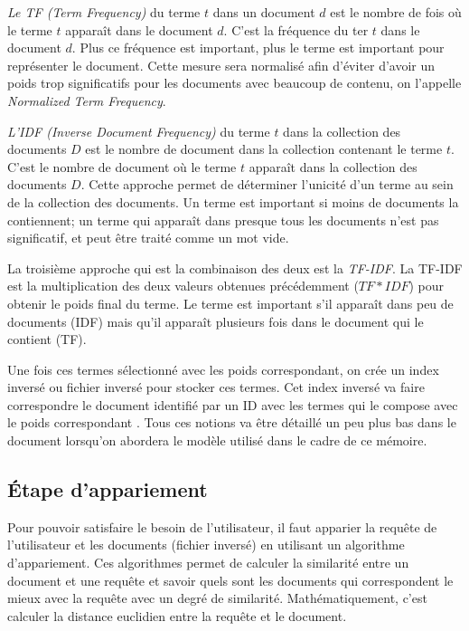 \textit{Le TF (Term Frequency)} du terme $t$ dans un document $d$ est le nombre de fois où le terme $t$ apparaît dans le document $d$. C'est la fréquence du ter $t$ dans le document $d$. Plus ce fréquence est important, plus le terme est important pour représenter le document. Cette mesure sera normalisé afin d'éviter d'avoir un poids trop significatifs pour les documents avec beaucoup de contenu, on l'appelle \textit{Normalized Term Frequency}.

\textit{L'IDF (Inverse Document Frequency)} du terme $t$ dans la collection des documents $D$ est le nombre de document dans la collection contenant le terme $t$. C'est le nombre de document où le terme $t$ apparaît dans la collection des documents $D$. Cette approche permet de déterminer l'unicité d'un terme au sein de la collection des documents. Un terme est important si moins de documents la contiennent; un terme qui apparaît dans presque tous les documents n'est pas significatif, et peut être traité comme un mot vide.

La troisième approche qui est la combinaison des deux est la \textit{TF-IDF}. La TF-IDF est la multiplication des deux valeurs obtenues précédemment ($TF*IDF$) pour obtenir le poids final du terme. Le terme est important s'il apparaît dans peu de documents (IDF) mais qu'il apparaît plusieurs fois dans le document qui le contient (TF).

Une fois ces termes sélectionné avec les poids correspondant, on crée un index inversé ou fichier inversé pour stocker ces termes. Cet index inversé va faire correspondre le document identifié par un ID avec les termes qui le compose avec le poids correspondant \citep*{vsm, vsm-for-arabic-language, sarch-engine-vsm, modern-ir}. Tous ces notions va être détaillé un peu plus bas dans le document lorsqu'on abordera le modèle utilisé dans le cadre de ce mémoire.

\subsection{Étape d’appariement}\label{sec:etape-appariement}
Pour pouvoir satisfaire le besoin de l'utilisateur, il faut apparier la requête de l'utilisateur et les documents (fichier inversé) en utilisant un algorithme d'appariement. Ces algorithmes permet de calculer la similarité entre un document et une requête et savoir 
quels sont les documents qui correspondent le mieux avec la requête avec un degré de similarité. Mathématiquement, c'est calculer la distance euclidien entre la requête et le document.

